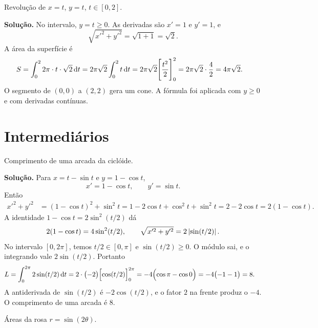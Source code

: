 \documentclass[11pt,a4paper]{article}
\begin{document}
\begin{exercicio}[Básico --- B4]
Revolução de \(x=t\), \(y=t\), \(t\in[0,2]\).
\end{exercicio}

\noindent\textbf{Solução.}
No intervalo, \(y=t\ge 0\). As derivadas são \(x'=1\) e \(y'=1\), e
\[
\sqrt{x'^{2}+y'^{2}}=\sqrt{1+1}=\sqrt{2}.
\]
A área da superfície é
\begin{align*}
S
&=\int_{0}^{2} 2\pi\cdot t\cdot\sqrt{2}\,\mathrm{d} t
=2\pi\sqrt{2}\int_{0}^{2} t\,\mathrm{d} t
=2\pi\sqrt{2}\Biggl[\frac{t^{2}}{2}\Biggr]_{0}^{2}
=2\pi\sqrt{2}\cdot\frac{4}{2}
=4\pi\sqrt{2}.
\end{align*}
O segmento de \((0,0)\) a \((2,2)\) gera um cone. A fórmula foi aplicada com \(y\ge 0\) e com derivadas contínuas.

\section{Intermediários}

\begin{exercicio}[Intermediário --- I1]
Comprimento de uma arcada da ciclóide.
\end{exercicio}

\noindent\textbf{Solução.}
Para \(x=t-\sin t\) e \(y=1-\cos t\),
\[
x'=1-\cos t,\qquad y'=\sin t.
\]
Então
\begin{align*}
x'^{2}+y'^{2}
&=(1-\cos t)^{2}+\sin^{2}t
=1-2\cos t+\cos^{2}t+\sin^{2}t
=2-2\cos t
=2(1-\cos t).
\end{align*}
A identidade \(1-\cos t=2\sin^{2}(t/2)\) dá
\[
2(1-\cos t)=4\sin^{2}(t/2),
\qquad
\sqrt{x'^{2}+y'^{2}}=2\left\lvert \sin(t/2) \right\rvert.
\]
No intervalo \([0,2\pi]\), temos \(t/2\in[0,\pi]\) e \(\sin(t/2)\ge 0\). O módulo sai, e o integrando vale \(2\sin(t/2)\). Portanto
\begin{align*}
L
&=\int_{0}^{2\pi} 2\sin(t/2)\,\mathrm{d} t
=2\cdot\bigl(-2\bigr)\Bigl[\cos(t/2)\Bigr]_{0}^{2\pi}
=-4\Bigl(\cos\pi-\cos 0\Bigr)
=-4\bigl(-1-1\bigr)
=8.
\end{align*}
A antiderivada de \(\sin(t/2)\) é \(-2\cos(t/2)\), e o fator \(2\) na frente produz o \(-4\). O comprimento de uma arcada é \(8\).

\begin{exercicio}[Intermediário --- I2]
Áreas da rosa \(r=\sin(2\theta)\).
\end{exercicio}
\end{document}
